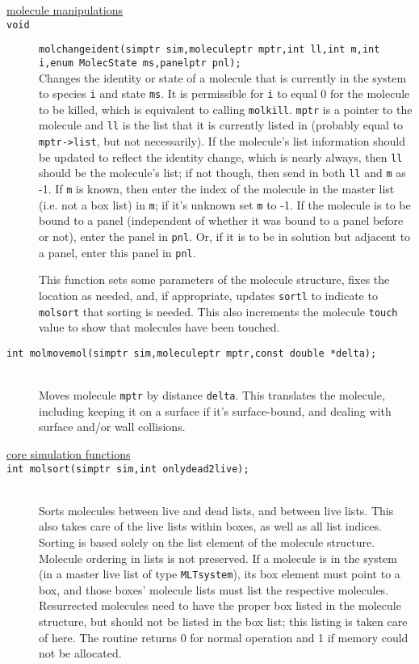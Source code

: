 \documentclass {scrbook}
\newcommand {\ttt} {\texttt}
\begin{document}
\begin{description}
\item[\underline{molecule manipulations}]

\item[\ttt{void}]
\ttt{molchangeident(simptr sim,moleculeptr mptr,int ll,int m,int i,enum MolecState ms,panelptr pnl);} \\
Changes the identity or state of a molecule that is currently in the system to species \ttt{i} and state \ttt{ms}. It is permissible for \ttt{i} to equal 0 for the molecule to be killed, which is equivalent to calling \ttt{molkill}. \ttt{mptr} is a pointer to the molecule and \ttt{ll} is the list that it is currently listed in (probably equal to \ttt{mptr->list}, but not necessarily). If the molecule's list information should be updated to reflect the identity change, which is nearly always, then \ttt{ll} should be the molecule's list; if not though, then send in both \ttt{ll} and \ttt{m} as -1. If \ttt{m} is known, then enter the index of the molecule in the master list (i.e. not a box list) in \ttt{m}; if it's unknown set \ttt{m} to -1. If the molecule is to be bound to a panel (independent of whether it was bound to a panel before or not), enter the panel in \ttt{pnl}. Or, if it is to be in solution but adjacent to a panel, enter this panel in \ttt{pnl}.

This function sets some parameters of the molecule structure, fixes the location as needed, and, if appropriate, updates \ttt{sortl} to indicate to \ttt{molsort} that sorting is needed. This also increments the molecule \ttt{touch} value to show that molecules have been touched.

\item[\ttt{int molmovemol(simptr sim,moleculeptr mptr,const double *delta);}]
\hfill \\
Moves molecule \ttt{mptr} by distance \ttt{delta}. This translates the molecule, including keeping it on a surface if it's surface-bound, and dealing with surface and/or wall collisions.


\item[\underline{core simulation functions}]

\item[\ttt{int molsort(simptr sim,int onlydead2live);}]
\hfill \\
Sorts molecules between live and dead lists, and between live lists. This also takes care of the live lists within boxes, as well as all list indices. Sorting is based solely on the list element of the molecule structure. Molecule ordering in lists is not preserved. If a molecule is in the system (in a master live list of type \ttt{MLTsystem}), its box element must point to a box, and those boxes' molecule lists must list the respective molecules. Resurrected molecules need to have the proper box listed in the molecule structure, but should not be listed in the box list; this listing is taken care of here. The routine returns 0 for normal operation and 1 if memory could not be allocated.


\end{description}
\end{document}
